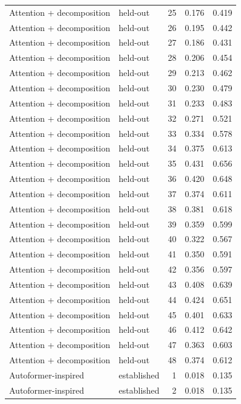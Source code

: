 \begin{tabular}{llrrr}
Attention + decomposition & held-out & 25 & 0.176 & 0.419 \\
Attention + decomposition & held-out & 26 & 0.195 & 0.442 \\
Attention + decomposition & held-out & 27 & 0.186 & 0.431 \\
Attention + decomposition & held-out & 28 & 0.206 & 0.454 \\
Attention + decomposition & held-out & 29 & 0.213 & 0.462 \\
Attention + decomposition & held-out & 30 & 0.230 & 0.479 \\
Attention + decomposition & held-out & 31 & 0.233 & 0.483 \\
Attention + decomposition & held-out & 32 & 0.271 & 0.521 \\
Attention + decomposition & held-out & 33 & 0.334 & 0.578 \\
Attention + decomposition & held-out & 34 & 0.375 & 0.613 \\
Attention + decomposition & held-out & 35 & 0.431 & 0.656 \\
Attention + decomposition & held-out & 36 & 0.420 & 0.648 \\
Attention + decomposition & held-out & 37 & 0.374 & 0.611 \\
Attention + decomposition & held-out & 38 & 0.381 & 0.618 \\
Attention + decomposition & held-out & 39 & 0.359 & 0.599 \\
Attention + decomposition & held-out & 40 & 0.322 & 0.567 \\
Attention + decomposition & held-out & 41 & 0.350 & 0.591 \\
Attention + decomposition & held-out & 42 & 0.356 & 0.597 \\
Attention + decomposition & held-out & 43 & 0.408 & 0.639 \\
Attention + decomposition & held-out & 44 & 0.424 & 0.651 \\
Attention + decomposition & held-out & 45 & 0.401 & 0.633 \\
Attention + decomposition & held-out & 46 & 0.412 & 0.642 \\
Attention + decomposition & held-out & 47 & 0.363 & 0.603 \\
Attention + decomposition & held-out & 48 & 0.374 & 0.612 \\
Autoformer-inspired & established & 1 & 0.018 & 0.135 \\
Autoformer-inspired & established & 2 & 0.018 & 0.135 \\

\end{tabular}
